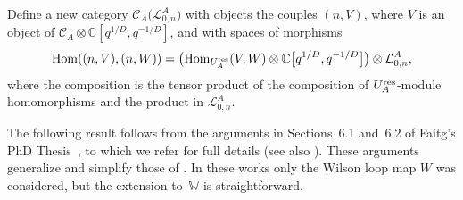\documentclass[pdftex]{sigma}%
\numberwithin{equation}{section}
\numberwithin{figure}{section}
\newcommand{\Ll}{{\mathcal L}}
\begin{document}
Define a new category $\mathcal{C}_{A}\big(\Ll_{0,n}^A\big)$ with objects the couples $(n,V)$, where $V$ is an object of $\mathcal{C}_A\otimes {\mathbb C}[q^{1/D},q^{-1/D}]$, and with spaces of morphisms
\[
\operatorname{Hom}( (n,V), (n,W))=\big(\!\operatorname{Hom}_ {U_A^{\rm res}}(V,W)\otimes {\mathbb C}\big[q^{1/D},q^{-1/D}\big]\big)\otimes \Ll_{0,n}^A,
\]
where the composition is the tensor product of the composition of $U_A^{\rm res}$-module homomorphisms and the product in $\Ll_{0,n}^A$.

The following result follows from the arguments in Sections~6.1 and~6.2 of Faitg's PhD The\-sis~\cite{Faitg}, to which we refer for full details (see also \cite{Faitg4}). These arguments generalize and simplify those of \cite{BR2}. In these works only the Wilson loop map $W$ was considered, but the extension to~$\mathbb{W}$ is straightforward.
\end{document}

